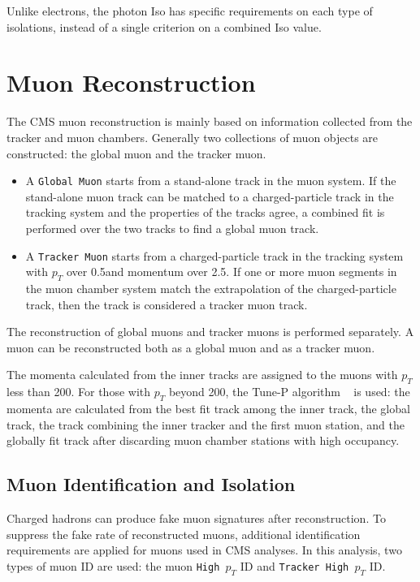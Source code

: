 \vspace{0.3cm}
Unlike electrons, the photon Iso has specific requirements on each type of isolations, instead of a single criterion on a combined Iso value.

\section{Muon Reconstruction}\label{sec:muonrecon}
The CMS muon reconstruction is mainly based on information collected from the tracker and muon chambers. Generally two collections of muon objects are constructed: the global muon and the tracker muon.~\cite{ob_muonconst1}
\begin{itemize}
\item A \texttt{Global Muon} starts from a stand-alone track in the muon system. If the stand-alone muon track can be matched to a charged-particle track in the tracking system and the properties of the tracks agree, a combined fit is performed over the two tracks to find a global muon track.
\item A \texttt{Tracker Muon} starts from a charged-particle track in the tracking system with $p_{T}$ over 0.5\GeV and momentum over 2.5\GeV. If one or more muon segments in the muon chamber system match the extrapolation of the charged-particle track, then the track is considered a tracker muon track.
\end{itemize}

The reconstruction of global muons and tracker muons is performed separately. A muon can be reconstructed both as a global muon and as a tracker muon.

\vspace{0.3cm}
The momenta calculated from the inner tracks are assigned to the muons with $p_{T}$ less than 200\GeV. For those with $p_T$ beyond 200\GeV, the Tune-P algorithm ~\cite{ob_muonconst2} is used: the momenta are calculated from the best fit track among the inner track, the global track, the track combining the inner tracker and the first muon station, and the globally fit track after discarding muon chamber stations with high occupancy. 

\subsection{Muon Identification and Isolation}\label{sec:ob_midiso}
Charged hadrons can produce fake muon signatures after reconstruction. To suppress the fake rate of reconstructed muons, additional identification requirements are applied for muons used in CMS analyses. In this analysis, two types of muon ID are used: the muon \texttt{High $p_T$} ID and \texttt{Tracker High $p_T$} ID. 

